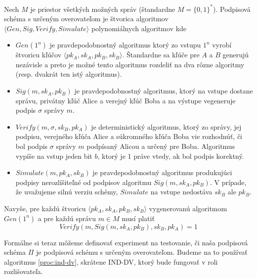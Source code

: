 \begin{definicia}
    Nech $M$ je priestor všetkých možných správ (štandardne
    $M=\{0,1\}^*$). Podpisová schéma s určeným overovateľom je
    štvorica algoritmov
    $\langle Gen, Sig, Verify, Simulate \rangle$ polynomiálnych
    algoritmov kde
    \begin{itemize}
        \item $Gen(1^n)$ je pravdepodobnostný algoritmus ktorý zo
            vstupu $1^n$ vyrobí štvoricu kľúčov
            $\langle pk_A,sk_A,pk_B,sk_B \rangle$.
            Štandardne sa kľúče pre $A$ a $B$ generujú nezávisle a
            preto je možné tento algoritmus rozdeliť na dva rôzne
            algoritmy (resp. dvakrát ten istý algoritmus).

        \item $Sig(m,sk_A,pk_B)$ je pravdepodobnostný algoritmus,
            ktorý na vstupe dostane správu, privátny kľúč Alice a
            verejný kľúč Boba a na výstupe vegeneruje podpis $\sigma$
            správy $m$.

        \item $Verify(m,\sigma,sk_B,pk_A)$ je deterministický
            algoritmus, ktorý zo správy, jej podpisu, verejného kľúča
            Alice a súkromného kľúča Boba vie rozhodnúť, či bol podpis
            $\sigma$ správy $m$ podpísaný Alicou a určený pre Boba.
            Algoritmus vypíše na vstup jeden bit $b$, ktorý je 1 práve
            vtedy, ak bol podpis korektný.

        \item $Simulate(m,pk_A,sk_B)$ je pravdepodobnostný algoritmus
            produkujúci podpisy nerozlíšiteľné od podpisov algoritmu
            $Sig(m,sk_A,pk_B)$.
            V prípade, že uvažujeme silnú verziu schémy, $Simulate$ na
            vstupe nedostáva $sk_B$ ale $pk_B$.
    \end{itemize}
    Navyše, pre každú štvoricu $\langle pk_A,sk_A,pk_B,sk_B \rangle$
    vygenerovanú algoritmom $Gen(1^n)$ a pre každú správu $m\in M$
    musí platiť
    \begin{equation*}
        Verify(m, Sig(m,sk_A,pk_B),sk_B,pk_A)=1
    \end{equation*}
\end{definicia}

Formálne si teraz môžeme definovať experiment na testovanie, či naša
podpisová schéma $\Pi$ je podpisová schému s určeným overovateľom.
Budeme na to používať algoritmus
\ref{proc:ind-dv}, skrátene IND-DV, ktorý bude fungovať v roli
rozlišovateľa.


